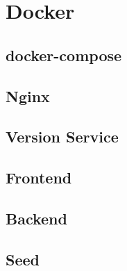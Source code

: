 \chapter{Docker}
    \section{docker-compose}
        
    
    \section{Nginx}
        
        
    \section{Version Service}
        
        
    \section{Frontend}
        
        
    \section{Backend}
        
        
    \section{Seed}
        